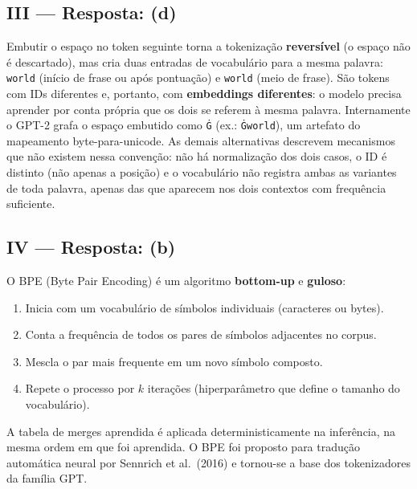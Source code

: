 \documentclass{dlproblemset}
\begin{document}
\subsection*{III — Resposta: (d)}
Embutir o espaço no token seguinte torna a tokenização \textbf{reversível} (o
espaço não é descartado), mas cria duas entradas de vocabulário para a mesma
palavra: \texttt{world} (início de frase ou após pontuação) e
\texttt{\textvisiblespace world} (meio de frase). São tokens com IDs diferentes e,
portanto, com \textbf{embeddings diferentes}: o modelo precisa aprender por conta
própria que os dois se referem à mesma palavra. Internamente o GPT-2 grafa o espaço
embutido como \texttt{\.{G}} (ex.: \texttt{\.{G}world}), um artefato do mapeamento
byte-para-unicode. As demais alternativas descrevem mecanismos que não existem
nessa convenção: não há normalização dos dois casos, o ID é distinto (não apenas a
posição) e o vocabulário não registra ambas as variantes de toda palavra, apenas
das que aparecem nos dois contextos com frequência suficiente.

\subsection*{IV — Resposta: (b)}
O BPE (Byte Pair Encoding) é um algoritmo \textbf{bottom-up} e \textbf{guloso}:
\begin{enumerate}
  \item Inicia com um vocabulário de símbolos individuais (caracteres ou bytes).
  \item Conta a frequência de todos os pares de símbolos adjacentes no corpus.
  \item Mescla o par mais frequente em um novo símbolo composto.
  \item Repete o processo por $k$ iterações (hiperparâmetro que define o tamanho do vocabulário).
\end{enumerate}
A tabela de merges aprendida é aplicada deterministicamente na inferência, na mesma
ordem em que foi aprendida. O BPE foi proposto para tradução automática neural por
Sennrich et al.\ (2016) e tornou-se a base dos tokenizadores da família GPT.

\end{document}
